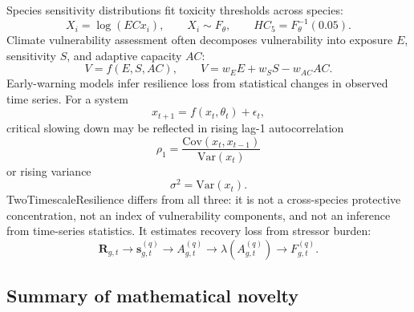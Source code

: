 	Species sensitivity distributions fit toxicity thresholds across species:
	\begin{equation}
		X_i=\log(ECx_i),\qquad X_i\sim F_\theta,
		\qquad
		HC_5=F_\theta^{-1}(0.05).
	\end{equation}
	Climate vulnerability assessment often decomposes vulnerability into exposure $E$, sensitivity $S$, and adaptive capacity $AC$:
	\begin{equation}
		V=f(E,S,AC),
		\qquad
		V=w_EE+w_SS-w_{AC}AC.
	\end{equation}
	Early-warning models infer resilience loss from statistical changes in observed time series. For a system
	\begin{equation}
		x_{t+1}=f(x_t,\theta_t)+\epsilon_t,
	\end{equation}
	critical slowing down may be reflected in rising lag-1 autocorrelation
	\begin{equation}
		\rho_1=\frac{\mathrm{Cov}(x_t,x_{t-1})}{\mathrm{Var}(x_t)}
	\end{equation}
	or rising variance
	\begin{equation}
		\sigma^2=\mathrm{Var}(x_t).
	\end{equation}
	TwoTimescaleResilience differs from all three: it is not a cross-species protective concentration, not an index of vulnerability components, and not an inference from time-series statistics. It estimates recovery loss from stressor burden:
	\begin{equation}
		\mathbf{R}_{g,t}\rightarrow\mathbf{s}_{g,t}^{(q)}\rightarrow A_{g,t}^{(q)}\rightarrow\lambda(A_{g,t}^{(q)})\rightarrow F_{g,t}^{(q)}.
	\end{equation}
	
	\subsection{Summary of mathematical novelty}
	
